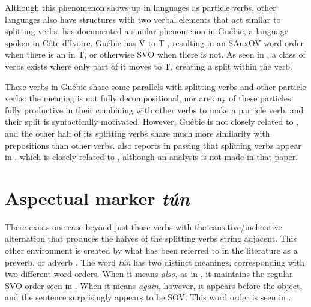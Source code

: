 \documentclass[output=paper]{LSP/langsci}
\begin{document}
Although this phenomenon shows up in  languages as particle verbs, other languages also have structures with two verbal elements that act similar to  splitting verbs. \cite{Sande2016} has documented a similar phenomenon in Gu\'{e}bie, a  language spoken in C\^{o}te d'Ivoire. Gu\'{e}bie has V to T , resulting in an SAuxOV word order when there is an  in T, or otherwise SVO when there is not. As seen in , a class of verbs exists where only part of it moves to T, creating a split within the verb.


\ea 
        
    
        
    \label{ex:parrish:guebie}
 \z 
\z


These verbs in Gu\'{e}bie share some parallels with  splitting verbs and other particle verbs: the meaning is not fully decompositional, nor are any of these particles fully productive in their combining with other verbs to make a particle verb, and their split is syntactically motivated. However, Gu\'{e}bie is not closely related to , and the other half of its splitting verbs share much more similarity with prepositions than other verbs. \citet{Ogie2009} also reports in passing that splitting verbs appear in , which is closely related to , although an analysis is not made in that paper.


\section{Aspectual marker \textit{t\'{u}n}}
\label{sect:parrish:TunSection}

There exists one case beyond just those verbs with the causitive/inchoative alternation that produces the halves of the splitting verbs string adjacent. This other environment is created by what has been referred to in the literature as a preverb, or adverb \citep{Bamgbose1966,Bode2007}. The word \textit{t\'{u}n} has two distinct meanings, corresponding with two different word orders. When it means \textit{also}, as in , it maintains the regular SVO order seen in . When it means \textit{again}, however, it appears before the object, and the sentence surprisingly appears to be SOV. This word order is seen in .
\end{document}
